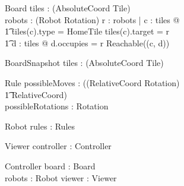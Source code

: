 \documentclass[12pt]{article}
\begin{document}
\begin{schema}{Board}
tiles : \power (AbsoluteCoord \fun Tile) \\
robots : \power (Robot \fun Rotation)
\where
\forall r : robots | \exists c : \dom tiles @  \\ \t1 tiles(c).type = HomeTile \wedge tiles(c).target = r \wedge \\ \t1 
\exists d : \dom tiles @ d.occupies = r \wedge Reachable((c, d))
\end{schema}

\begin{schema}{BoardSnapshot}
tiles : \power (AbsoluteCoord \fun Tile) \\
\end{schema}

\begin{schema}{Rule}
possibleMoves : \power ((RelativeCoord \times Rotation) \psurj \\ \t1 \seq RelativeCoord) \\
possibleRotations : \power Rotation
\end{schema}

\begin{schema}{Robot}
rules : Rules
\end{schema}

\begin{schema}{Viewer}
controller : Controller
\end{schema}

\begin{schema}{Controller}
board : Board \\
robots : \power Robot
viewer : Viewer
\end{schema}
\end{document}
